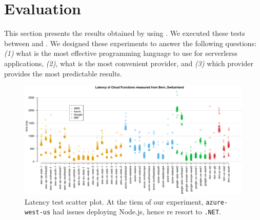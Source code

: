 \section{Evaluation}
\label{sec:evaluation}
This section presents the results obtained by using \sys. 
We executed these tests between  and .
We designed these experiments to answer the following questions: \emph{(1)} what is the most effective programming language to use for serverlerss applications, \emph{(2)}, what is the most convenient provider, and \emph{(3)} which provider provides the most predictable results.

%

\begin{figure}[!t]
\begin{center}
\includegraphics[width=1.0\textwidth]{bilder/latency/scatterplot_latency.pdf}
\caption{Latency test scatter plot. At the tiem of our experiment, \texttt{azure-west-us}  had issues deploying Node.js, hence re resort to \texttt{.NET}.  }
\label{fig:latency_plot}
\end{center}
\end{figure}

